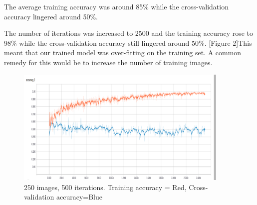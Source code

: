 \documentclass[letterpaper]{article}
\begin{document}
The average training accuracy was around 85\% while the cross-validation accuracy lingered around 50\%.

The number of iterations was increased to 2500 and the training accuracy rose to 98\% while the cross-validation accuracy still lingered around 50\%. [Figure 2]This meant that our trained model was over-fitting on the training set. A common remedy for this would be to increase the number of training images.\\

\begin{figure}[!htb]
	\begin{center}
		\includegraphics[width=4in]{250_img_2500_it_accuracy.png}
		\caption{250 images, 500 iterations. Training accuracy = Red, Cross-validation accuracy=Blue}
		\label{fig1}
	\end{center}
\end{figure}

\begin{table}[!hbt]
\vskip 0.25cm
\caption{Sample table caption.}
\end{table}


\footnotesize


\end{document}
